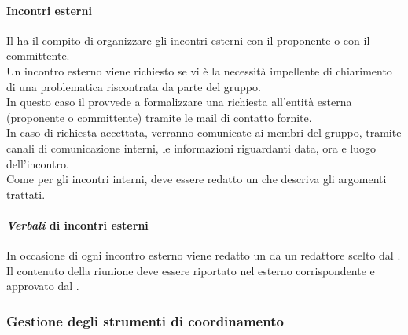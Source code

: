 \paragraph{Incontri esterni}
Il \roleProjectManagerLow{} ha il compito di organizzare gli incontri esterni con il proponente o con il committente.\\
Un incontro esterno viene richiesto se vi è la necessità impellente di chiarimento di una problematica riscontrata da parte del gruppo.\\
In questo caso il \roleProjectManagerLow{} provvede a formalizzare una richiesta all'entità esterna (proponente o committente) tramite le mail di contatto fornite.\\
In caso di richiesta accettata, verranno comunicate ai membri del gruppo, tramite canali di comunicazione interni, le informazioni riguardanti data, ora e luogo dell'incontro.\\
Come per gli incontri interni, deve essere redatto un \docNameVLow{} che descriva gli argomenti trattati.
\paragraph {\textit{Verbali} di incontri esterni}
In occasione di ogni incontro esterno viene redatto un \docNameVLow{} da un redattore scelto dal \roleProjectManagerLow. Il contenuto della riunione deve essere riportato nel \docNameVLow{} esterno corrispondente e approvato dal \roleProjectManagerLow.

\subsubsection{Gestione degli strumenti di coordinamento}
